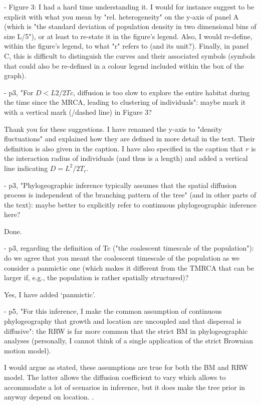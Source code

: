 \documentclass[11pt, oneside]{article}   	%
\newcommand{\response}[1]{{\color{black}{\bf Response:} #1}}
\begin{document}
- Figure 3: I had a hard time understanding it. I would for instance suggest to be explicit with what you mean by "rel. heterogeneity" on the y-axis of panel A (which is "the standard deviation of population density in two dimensional bins of size L/5"), or at least to re-state it in the figure's legend. Also, I would re-define, within the figure's legend, to what "r" refers to (and its unit?). Finally, in panel C, this is difficult to distinguish the curves and their associated symbols (symbols that could also be re-defined in a colour legend included within the box of the graph).

- p3, "For $D < L2/2Tc$, diffusion is too slow to explore the entire habitat during the time since the MRCA, leading to clustering of individuals": maybe mark it with a vertical mark (/dashed line) in Figure 3?

\response{Thank you for these suggestions. I have renamed the y-axis to "density fluctuations" and explained how they are defined in more detail in the text. Their definition is also given in the caption. I have also specified in the caption that $r$ is the interaction radius of individuals (and thus is a length) and added a vertical line indicating $D=L^2/2T_c$.  }


- p3, "Phylogeographic inference typically assumes that the spatial diffusion process is independent of the branching pattern of the tree" (and in other parts of the text): maybe better to explicitly refer to continuous phylogeographic inference here?

\response{Done.}

- p3, regarding the definition of Tc ("the coalescent timescale of the population"): do we agree that you meant the coalescent timescale of the population as we consider a panmictic one (which makes it different from the TMRCA that can be larger if, e.g., the population is rather spatially structured)?

\response{Yes, I have added `panmictic'.}

- p5, "For this inference, I make the common assumption of continuous phylogeography that growth and location are uncoupled and that dispersal is diffusive": the RRW is far more common that the strict BM in phylogeographic analyses (personally, I cannot think of a single application of the strict Brownian motion model).

\response{I would argue as stated, these assumptions are true for both the BM and RRW model. The latter allows the diffusion coefficient to vary which allows to accommodate a lot of scenarios in inference, but it does make the tree prior in anyway depend on location. }.
\end{document}
